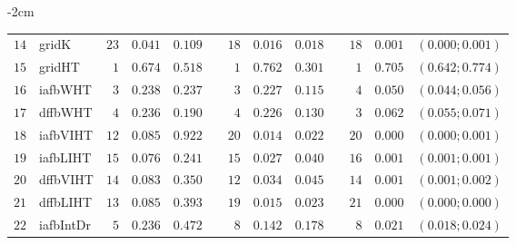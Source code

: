 \begin{table*}[!htbp]
\begin{adjustwidth*}{}{-2cm}
\begin{tabular}{@{}rlrrrrrrrrrcc@{}}
\footnotesize{$14$} & \footnotesize{gridK    } & \footnotesize{$23$} & \footnotesize{$0.041$} & \footnotesize{$0.109$} && \footnotesize{$18$} & \footnotesize{$0.016$} & \footnotesize{$0.018$} && \footnotesize{$18$} & \footnotesize{$0.001$} & \footnotesize{$(0.000;0.001)$} \\
\footnotesize{$15$} & \footnotesize{gridHT   } & \footnotesize{$1 $} & \footnotesize{$0.674$} & \footnotesize{$0.518$} && \footnotesize{$1 $} & \footnotesize{$0.762$} & \footnotesize{$0.301$} && \footnotesize{$1 $} & \footnotesize{$0.705$} & \footnotesize{$(0.642;0.774)$} \\
\footnotesize{$16$} & \footnotesize{iafbWHT  } & \footnotesize{$3 $} & \footnotesize{$0.238$} & \footnotesize{$0.237$} && \footnotesize{$3 $} & \footnotesize{$0.227$} & \footnotesize{$0.115$} && \footnotesize{$4 $} & \footnotesize{$0.050$} & \footnotesize{$(0.044;0.056)$} \\
\footnotesize{$17$} & \footnotesize{dffbWHT  } & \footnotesize{$4 $} & \footnotesize{$0.236$} & \footnotesize{$0.190$} && \footnotesize{$4 $} & \footnotesize{$0.226$} & \footnotesize{$0.130$} && \footnotesize{$3 $} & \footnotesize{$0.062$} & \footnotesize{$(0.055;0.071)$} \\
\footnotesize{$18$} & \footnotesize{iafbVIHT } & \footnotesize{$12$} & \footnotesize{$0.085$} & \footnotesize{$0.922$} && \footnotesize{$20$} & \footnotesize{$0.014$} & \footnotesize{$0.022$} && \footnotesize{$20$} & \footnotesize{$0.000$} & \footnotesize{$(0.000;0.001)$} \\
\footnotesize{$19$} & \footnotesize{iafbLIHT } & \footnotesize{$15$} & \footnotesize{$0.076$} & \footnotesize{$0.241$} && \footnotesize{$15$} & \footnotesize{$0.027$} & \footnotesize{$0.040$} && \footnotesize{$16$} & \footnotesize{$0.001$} & \footnotesize{$(0.001;0.001)$} \\
\footnotesize{$20$} & \footnotesize{dffbVIHT } & \footnotesize{$14$} & \footnotesize{$0.083$} & \footnotesize{$0.350$} && \footnotesize{$12$} & \footnotesize{$0.034$} & \footnotesize{$0.045$} && \footnotesize{$14$} & \footnotesize{$0.001$} & \footnotesize{$(0.001;0.002)$} \\
\footnotesize{$21$} & \footnotesize{dffbLIHT } & \footnotesize{$13$} & \footnotesize{$0.085$} & \footnotesize{$0.393$} && \footnotesize{$19$} & \footnotesize{$0.015$} & \footnotesize{$0.023$} && \footnotesize{$21$} & \footnotesize{$0.000$} & \footnotesize{$(0.000;0.000)$} \\
\footnotesize{$22$} & \footnotesize{iafbIntDr} & \footnotesize{$5 $} & \footnotesize{$0.236$} & \footnotesize{$0.472$} && \footnotesize{$8 $} & \footnotesize{$0.142$} & \footnotesize{$0.178$} && \footnotesize{$8 $} & \footnotesize{$0.021$} & \footnotesize{$(0.018;0.024)$} \\

\end{tabular}
\end{adjustwidth*}
\end{table*}
